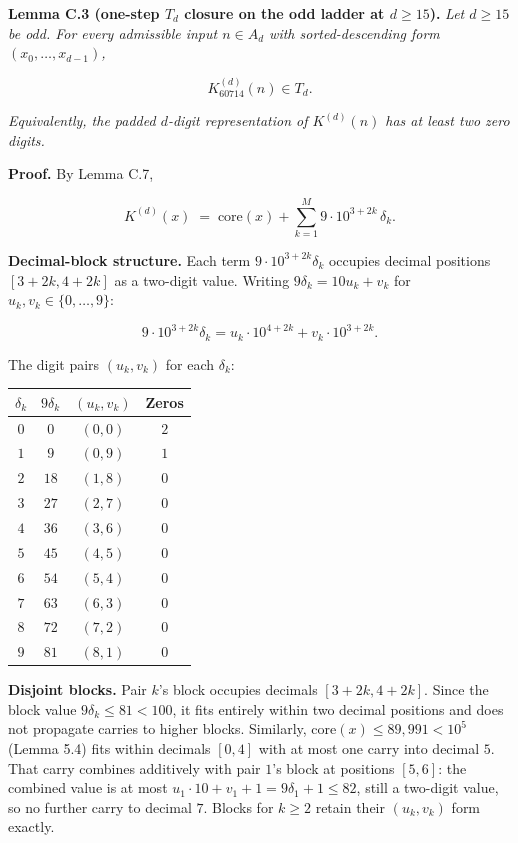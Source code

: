 \documentclass[11pt,letterpaper]{article}
\theoremstyle{paperstyle}
\theoremstyle{paperstyledef}
\theoremstyle{paperstylerem}
\begin{document}
\textbf{Lemma C.3 (one-step \(T_d\) closure on the odd ladder at
\(d \geq 15\)).} \emph{Let \(d \geq 15\) be odd. For every admissible
input \(n \in A_d\) with sorted-descending form
\((x_0, \ldots, x_{d-1})\),}

\[K^{(d)}_{60714}(n) \in T_d.\]

\emph{Equivalently, the padded \(d\)-digit representation of
\(K^{(d)}(n)\) has at least two zero digits.}

\textbf{Proof.} By Lemma C.7,

\[K^{(d)}(x) \;=\; \mathrm{core}(x) + \sum_{k=1}^{M} 9 \cdot 10^{3 + 2k} \, \delta_k.\]

\textbf{Decimal-block structure.} Each term
\(9 \cdot 10^{3 + 2k} \delta_k\) occupies decimal positions
\([3 + 2k, 4 + 2k]\) as a two-digit value. Writing
\(9 \delta_k = 10 u_k + v_k\) for \(u_k, v_k \in \{0, \ldots, 9\}\):

\[9 \cdot 10^{3 + 2k} \delta_k = u_k \cdot 10^{4 + 2k} + v_k \cdot 10^{3 + 2k}.\]

The digit pairs \((u_k, v_k)\) for each \(\delta_k\):

\begin{longtable}[]{@{}cccc@{}}
\toprule\noalign{}
\(\delta_k\) & \(9 \delta_k\) & \((u_k, v_k)\) & Zeros \\
\midrule\noalign{}
\endhead
\bottomrule\noalign{}
\endlastfoot
\(0\) & \(0\) & \((0, 0)\) & \(2\) \\
\(1\) & \(9\) & \((0, 9)\) & \(1\) \\
\(2\) & \(18\) & \((1, 8)\) & \(0\) \\
\(3\) & \(27\) & \((2, 7)\) & \(0\) \\
\(4\) & \(36\) & \((3, 6)\) & \(0\) \\
\(5\) & \(45\) & \((4, 5)\) & \(0\) \\
\(6\) & \(54\) & \((5, 4)\) & \(0\) \\
\(7\) & \(63\) & \((6, 3)\) & \(0\) \\
\(8\) & \(72\) & \((7, 2)\) & \(0\) \\
\(9\) & \(81\) & \((8, 1)\) & \(0\) \\
\end{longtable}

\textbf{Disjoint blocks.} Pair \(k\)'s block occupies decimals
\([3 + 2k, 4 + 2k]\). Since the block value
\(9 \delta_k \leq 81 < 100\), it fits entirely within two decimal
positions and does not propagate carries to higher blocks. Similarly,
\(\mathrm{core}(x) \leq 89{,}991 < 10^5\) (Lemma 5.4) fits within
decimals \([0, 4]\) with at most one carry into decimal \(5\). That
carry combines additively with pair \(1\)'s block at positions
\([5, 6]\): the combined value is at most
\(u_1 \cdot 10 + v_1 + 1 = 9 \delta_1 + 1 \leq 82\), still a two-digit
value, so no further carry to decimal \(7\). Blocks for \(k \geq 2\)
retain their \((u_k, v_k)\) form exactly.
\end{document}
